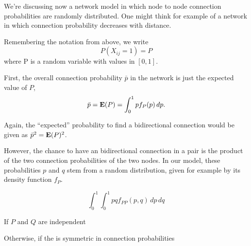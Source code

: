 
We're discussing now a network model in which node to node connection probabilities are randomly distributed. One might think for example of a network in which connection probability decreases with distance.

Remembering the notation from above, we write
\[
P(X_{ij}=1) = P
\]
where P is a random variable with values in $[0,1]$.

First, the overall connection probability $\bar{p}$ in the network is just the expected value of $P$,
\[
\bar{p} = \operatorname{\mathbf{E}}(P) = \int_0^1 p f_P(p)\, dp.
\]

Again, the \enquote{expected} probability to find a bidirectional connection would be given as $\bar{p}^2 = \operatorname{\mathbf{E}}(P)^2$.

However, the chance to have an bidirectional connection in a pair is the product of the two connection probabilities of the two nodes. In our model, these probabilities $p$ and $q$ stem from a random distribution, given for example by its density function $f_P$.


\[
\int_0^1 \int_0^1 pq f_{PP}(p,q) \,dp\,dq
\]

If $P$ and $Q$ are independent


Otherwise, if the is symmetric in connection probabilities
